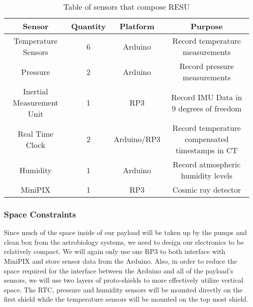 \begin{table}[h!]
\centering
\caption{Table of sensors that compose RESU}
\label{tab:Sensors}
\bigskip
\begin{tabular}{|c|c|c|c|}
\hline
\multicolumn{1}{|c|}{\bfseries Sensor} & {\bfseries Quantity} & {\bfseries Platform} & {\bfseries Purpose} \\
\hline
    Temperature Sensors         		& 6 & Arduino  		& Record temperature measurements  \\ \hline
    Pressure        				& 2 & Arduino 		& Record pressure measurements \\ \hline
    Inertial Measurement Unit       		& 1 & RP3    		& Record IMU Data in 9 degrees of freedom \\ \hline    
    Real Time Clock 				& 2 & Arduino/RP3 	& Record temperature compensated timestamps in CT \\\hline
    Humidity        				& 1 & Arduino 		& Record atmospheric humidity levels \\ \hline
    MiniPIX         				& 1 & RP3     		& Cosmic ray detector \\ \hline
\end{tabular}
\end{table}


\subsubsection{Space Constraints}
Since much of the space inside of our payload will be taken up by the pumps and clean box from the astrobiology systems, we need to design our electronics to be relatively compact. We will again only use one RP3 to both interface with MiniPIX and store sensor data from the Arduino.  Also, in order to reduce the space required for the interface between the Arduino and all of the payload's sensors, we will use two layers of proto-shields to more effectively utilize vertical space. The RTC, pressure and humidity sensors will be mounted directly on the first shield while the temperature sensors will be mounted on the top most shield. 

